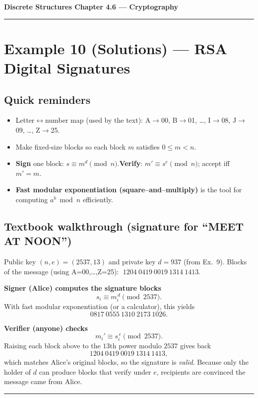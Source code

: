 \documentclass[12pt]{article}
\begin{document}
{\large \textbf{Discrete Structures \quad Chapter 4.6 — Cryptography}}

\hrule
\vspace{0.6em}

\section*{Example 10 (Solutions) — RSA Digital Signatures}

\subsection*{Quick reminders}
\begin{itemize}
  \item Letter$\leftrightarrow$number map (used by the text): A$\!\to$00, B$\!\to$01, \dots, I$\!\to$08, J$\!\to$09, \dots, Z$\!\to$25.
  \item Make fixed-size blocks so each block $m$ satisfies $0\le m < n$.
  \item \textbf{Sign} one block: $s \equiv m^{d} \pmod n$.\quad \textbf{Verify}: $m' \equiv s^{e} \pmod n$; accept iff $m'=m$.
  \item \textbf{Fast modular exponentiation (square–and–multiply)} is the tool for computing $a^b \bmod n$ efficiently.
\end{itemize}

\subsection*{Textbook walkthrough (signature for “MEET AT NOON”)}
Public key $(n,e)=(2537,13)$ and private key $d=937$ (from Ex.\ 9).  
Blocks of the message (using A=00,\dots,Z=25): \(\;1204\ 0419\ 0019\ 1314\ 1413.\)

\textbf{Signer (Alice) computes the signature blocks}
\[
s_i \equiv m_i^{\,d} \pmod{2537}.
\]
With fast modular exponentiation (or a calculator), this yields
\[
\boxed{0817\ 0555\ 1310\ 2173\ 1026}.
\]

\textbf{Verifier (anyone) checks}
\[
m_i' \equiv s_i^{\,e}\pmod{2537}.
\]
Raising each block above to the $13$th power modulo $2537$ gives back
\[
1204\ 0419\ 0019\ 1314\ 1413,
\]
which matches Alice’s original blocks, so the signature is \emph{valid}. Because only the holder of $d$ can produce blocks that verify under $e$, recipients are convinced the message came from Alice.

\bigskip
\hrule
\vspace{0.5em}
\end{document}
